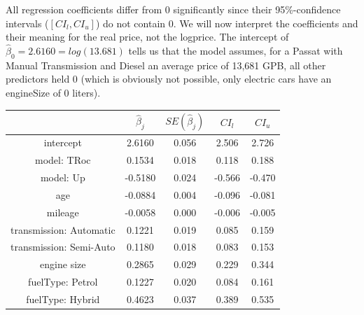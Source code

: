 \documentclass[12 pt]{scrartcl}
\begin{document}
All regression coefficients differ from 0 significantly since their 95\%-confidence intervals ($[CI_l, CI_u]$) do not contain 0.
We will now interpret the coefficients and their meaning for the real price, not the logprice.
The intercept of $\hat{\beta}_0 = 2.6160 = log(13.681)$ tells us that the model assumes, for a Passat with Manual Transmission and Diesel an average price of 13,681 GPB, all other predictors held 0 (which is obviously not possible, only electric cars have an engineSize of 0 liters).

\begin{table}[ht]
  \centering
  \label{tab:finalregression}
  \begin{tabular}{c|cccc}
                            & $\hat{\beta}_j$ & $SE(\hat{\beta}_j)$ & $CI_l$ & $CI_u$ \\
    \hline
    intercept               & 2.6160          & 0.056               & 2.506  & 2.726  \\
    model: TRoc             & 0.1534          & 0.018               & 0.118  & 0.188  \\
    model: Up               & -0.5180         & 0.024               & -0.566 & -0.470 \\
    age                     & -0.0884         & 0.004               & -0.096 & -0.081 \\
    mileage                 & -0.0058         & 0.000               & -0.006 & -0.005 \\
    transmission: Automatic & 0.1221          & 0.019               & 0.085  & 0.159  \\
    transmission: Semi-Auto & 0.1180          & 0.018               & 0.083  & 0.153  \\
    engine size             & 0.2865          & 0.029               & 0.229  & 0.344  \\
    fuelType: Petrol        & 0.1227          & 0.020               & 0.084  & 0.161  \\
    fuelType: Hybrid        & 0.4623          & 0.037               & 0.389  & 0.535  \\
  \end{tabular}
\end{table}
\end{document}
